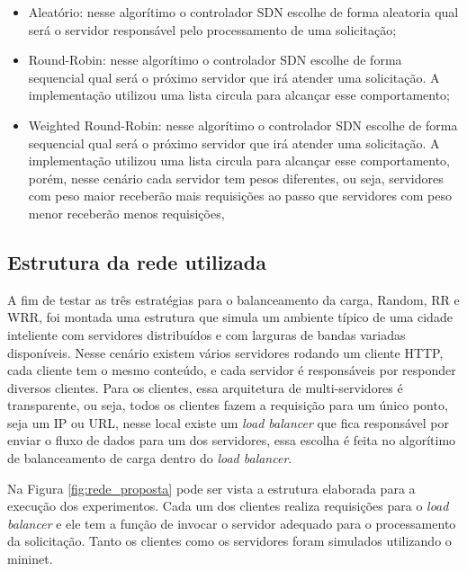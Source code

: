 \documentclass[12pt]{article}
\begin{document}
\begin{itemize}
    \item Aleatório: nesse algorítimo o controlador SDN escolhe de forma aleatoria qual será o servidor responsável pelo processamento de uma solicitação;
    \item Round-Robin: nesse algorítimo o controlador SDN escolhe de forma sequencial qual será o próximo servidor que irá atender uma solicitação. A implementação utilizou uma lista circula para alcançar esse comportamento;
    \item Weighted Round-Robin: nesse algorítimo o controlador SDN escolhe de forma sequencial qual será o próximo servidor que irá atender uma solicitação. A implementação utilizou uma lista circula para alcançar esse comportamento, porém, nesse cenário cada servidor tem pesos diferentes, ou seja, servidores com peso maior receberão mais requisições ao passo que servidores com peso menor receberão menos requisições,
\end{itemize}

\subsection{Estrutura da rede utilizada}

A fim de testar as três estratégias para o balanceamento da carga, Random, RR e WRR, foi montada uma estrutura que simula um ambiente típico de uma cidade inteliente com servidores distribuídos e com larguras de bandas variadas disponíveis. Nesse cenário existem vários servidores rodando um cliente HTTP, cada cliente tem o mesmo conteúdo, e cada servidor é responsáveis por responder diversos clientes. Para os clientes, essa arquitetura de multi-servidores é transparente, ou seja, todos os clientes fazem a requisição para um único ponto, seja um IP ou URL, nesse local existe um \textit{load balancer} que fica responsável por enviar o fluxo de dados para um dos servidores, essa escolha é feita no algorítimo de balanceamento de carga dentro do \textit{load balancer}. 

Na Figura \ref{fig:rede_proposta} pode ser vista a estrutura elaborada para a execução dos experimentos. Cada um dos clientes realiza requisições para o \textit{load balancer} e ele tem a função de invocar o servidor adequado para o processamento da solicitação. Tanto os clientes como os servidores foram simulados utilizando o mininet.
\end{document}

